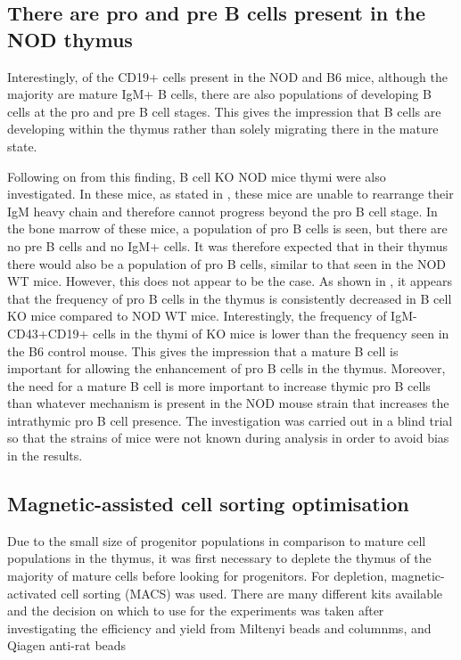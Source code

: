 \subsection{There are pro and pre B cells present in the NOD thymus}

Interestingly, of the CD19+ cells present in the NOD and B6 mice, although the majority are mature IgM+ B cells, there are also populations of developing B cells at the pro and pre B cell stages.
This gives the impression that B cells are developing within the thymus rather than solely migrating there in the mature state. 

Following on from this finding, B cell KO NOD mice thymi were also investigated.
In these mice, as stated in , these mice are unable to rearrange their IgM heavy chain and therefore cannot progress beyond the pro B cell stage. 
In the bone marrow of these mice, a population of pro B cells is seen, but there are no pre B cells and no IgM+ cells.
It was therefore expected that in their thymus there would also be a population of pro B cells, similar to that seen in the NOD WT mice. 
However, this does not appear to be the case.
As shown in , it appears that the frequency of pro B cells in the thymus is consistently decreased in B cell KO mice compared to NOD WT mice.
Interestingly, the frequency of IgM-CD43+CD19+ cells in the thymi of KO mice is lower than the frequency seen in the B6 control mouse. 
This gives the impression that a mature B cell is important for allowing the enhancement of pro B cells in the thymus.
Moreover, the need for a mature B cell is more important to increase thymic pro B cells than whatever mechanism is present in the NOD mouse strain that increases the intrathymic pro B cell presence.
The investigation was carried out in a blind trial so that the strains of mice were not known during analysis in order to avoid bias in the results.



\subsection{Magnetic-assisted cell sorting optimisation}

Due to the small size of progenitor populations in comparison to mature cell populations in the thymus, it was first necessary to deplete the thymus of the majority of mature cells before looking for progenitors.
For depletion, magnetic-activated cell sorting (MACS) was used.
There are many different kits available and the decision on which to use for the experiments was taken after investigating the efficiency and yield from Miltenyi beads and columnms, and Qiagen anti-rat beads 

